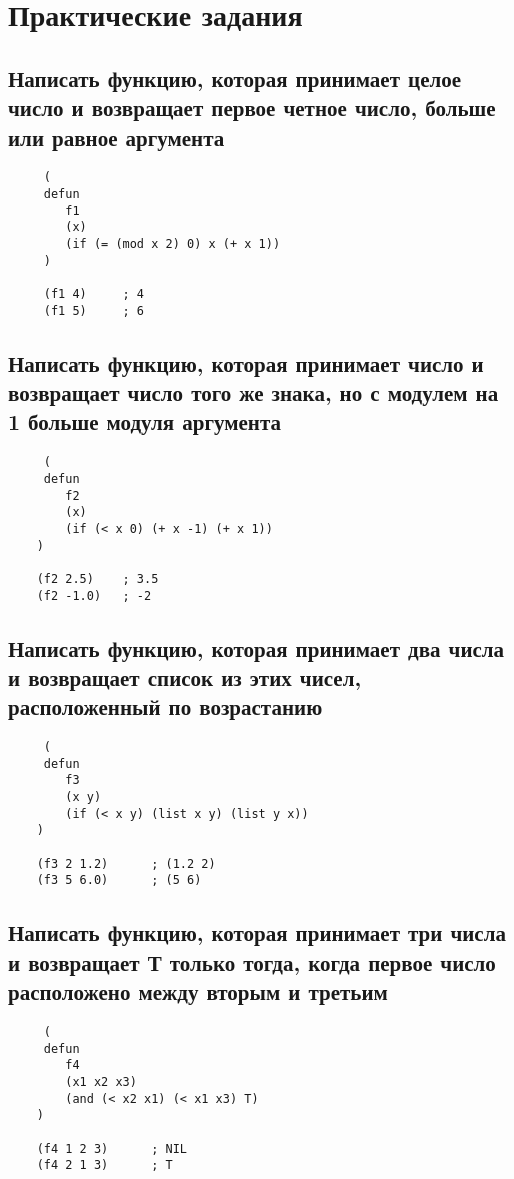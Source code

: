 \chapter{Практические задания}

\section{Написать функцию, которая принимает целое число и возвращает первое четное число, больше или равное аргумента}

\begin{lstlisting}
     (
     defun
        f1
        (x)
        (if (= (mod x 2) 0) x (+ x 1))
     )

     (f1 4)     ; 4
     (f1 5)     ; 6
\end{lstlisting}

\section{Написать функцию, которая принимает число и возвращает число того же знака, но с модулем на 1 больше модуля аргумента}

\begin{lstlisting}
     (
     defun
        f2
        (x)
        (if (< x 0) (+ x -1) (+ x 1))
    )

    (f2 2.5)    ; 3.5
    (f2 -1.0)   ; -2
\end{lstlisting}

\section{Написать функцию, которая принимает два числа и возвращает
список из этих чисел, расположенный по возрастанию}

\newpage 

\begin{lstlisting}
     (
     defun
        f3
        (x y)
        (if (< x y) (list x y) (list y x))
    )

    (f3 2 1.2)      ; (1.2 2)
    (f3 5 6.0)      ; (5 6)
\end{lstlisting}

\section{Написать функцию, которая принимает три числа и возвращает Т только тогда, когда первое число расположено между вторым и третьим}

\begin{lstlisting}
     (
     defun
        f4
        (x1 x2 x3)
        (and (< x2 x1) (< x1 x3) T)
    )

    (f4 1 2 3)      ; NIL
    (f4 2 1 3)      ; T
\end{lstlisting}

